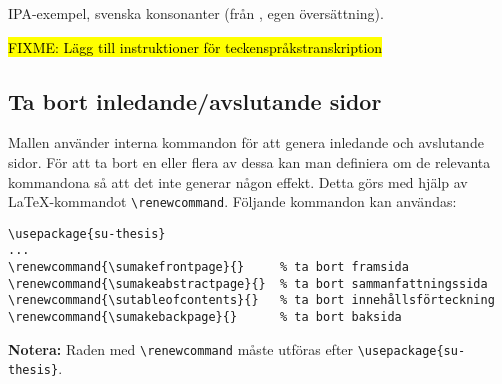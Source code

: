 \begin{table}
  \caption{IPA-exempel, svenska konsonanter (från \citealp[140]{engstrand-1999},
    egen översättning).}
  \label{tab-ipa}
  \vspace{.5em}
  
  \vspace{1em}
\end{table}

\hl{FIXME: Lägg till instruktioner för teckenspråkstranskription}


\subsection{Ta bort inledande/avslutande sidor}
\label{genererade}

Mallen använder interna kommandon för att genera inledande och avslutande
sidor. För att ta bort en eller flera av dessa kan man definiera om de
relevanta kommandona så att det inte generar någon effekt. Detta görs med hjälp
av \LaTeX{}-kommandot \verb|\renewcommand|. Följande kommandon kan användas:

\begin{verbatim}
\usepackage{su-thesis}
...
\renewcommand{\sumakefrontpage}{}     % ta bort framsida
\renewcommand{\sumakeabstractpage}{}  % ta bort sammanfattningssida
\renewcommand{\sutableofcontents}{}   % ta bort innehållsförteckning
\renewcommand{\sumakebackpage}{}      % ta bort baksida
\end{verbatim}

\noindent\textbf{Notera:} Raden med \verb|\renewcommand| måste utföras efter
\verb|\usepackage{su-thesis}|.

